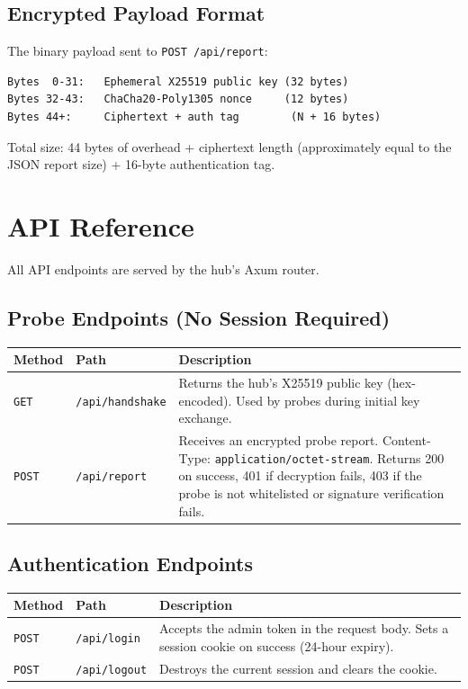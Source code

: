 \documentclass[12pt]{report}
\begin{document}
\subsection{Encrypted Payload Format}

The binary payload sent to \texttt{POST /api/report}:

\begin{lstlisting}
Bytes  0-31:   Ephemeral X25519 public key (32 bytes)
Bytes 32-43:   ChaCha20-Poly1305 nonce     (12 bytes)
Bytes 44+:     Ciphertext + auth tag        (N + 16 bytes)
\end{lstlisting}

Total size: 44 bytes of overhead + ciphertext length (approximately equal to
the JSON report size) + 16-byte authentication tag.

\section{API Reference}

All API endpoints are served by the hub's Axum router.

\subsection{Probe Endpoints (No Session Required)}

\begin{longtable}{@{} l l p{6cm} @{}}
\toprule
\textbf{Method} & \textbf{Path} & \textbf{Description} \\
\midrule
\texttt{GET} & \texttt{/api/handshake} & Returns the hub's X25519 public key
    (hex-encoded). Used by probes during initial key exchange. \\
\texttt{POST} & \texttt{/api/report} & Receives an encrypted probe report.
    Content-Type: \texttt{application/octet-stream}. Returns 200 on success,
    401 if decryption fails, 403 if the probe is not whitelisted or signature
    verification fails. \\
\bottomrule
\end{longtable}

\subsection{Authentication Endpoints}

\begin{longtable}{@{} l l p{6cm} @{}}
\toprule
\textbf{Method} & \textbf{Path} & \textbf{Description} \\
\midrule
\texttt{POST} & \texttt{/api/login} & Accepts the admin token in the request
    body. Sets a session cookie on success (24-hour expiry). \\
\texttt{POST} & \texttt{/api/logout} & Destroys the current session and
    clears the cookie. \\
\bottomrule
\end{longtable}
\end{document}
